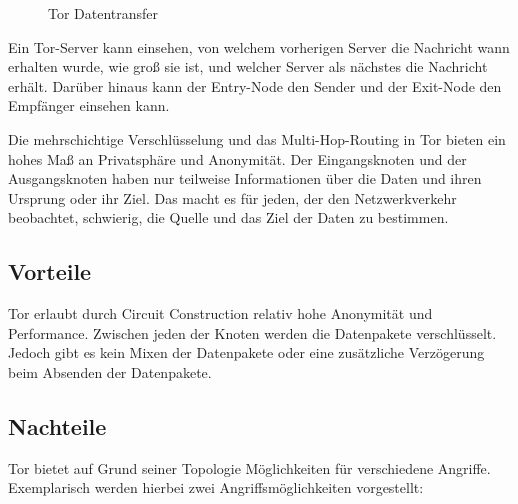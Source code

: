 \begin{figure}[h!]
    \centering
    
    \caption{Tor Datentransfer}
    \label{imgs:tor_transfer}
\end{figure}

Ein Tor-Server kann einsehen, von welchem vorherigen Server die Nachricht wann erhalten wurde, wie groß sie ist, und welcher Server als nächstes die Nachricht erhält. Darüber hinaus kann der Entry-Node den Sender und der Exit-Node den Empfänger einsehen kann.

Die mehrschichtige Verschlüsselung und das Multi-Hop-Routing in Tor bieten ein hohes Maß an Privatsphäre und Anonymität. Der Eingangsknoten und der Ausgangsknoten haben nur teilweise Informationen über die Daten und ihren Ursprung oder ihr Ziel. Das macht es für jeden, der den Netzwerkverkehr beobachtet, schwierig, die Quelle und das Ziel der Daten zu bestimmen\footnotemark{}.

\subsection{Vorteile}

Tor erlaubt durch Circuit Construction relativ hohe Anonymität und Performance. Zwischen jeden der Knoten werden die Datenpakete verschlüsselt. Jedoch gibt es kein Mixen der Datenpakete oder eine zusätzliche Verzögerung beim Absenden der Datenpakete.

\subsection{Nachteile}

Tor bietet auf Grund seiner Topologie Möglichkeiten für verschiedene Angriffe. Exemplarisch werden hierbei zwei Angriffsmöglichkeiten vorgestellt:

